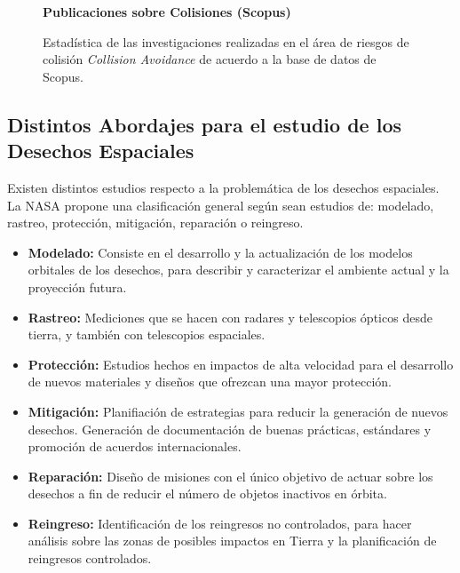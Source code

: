 \begin{figure}[!h]
\centering
   \textbf{Publicaciones sobre Colisiones (Scopus)}\par\medskip
    \caption[Riesgos de Colisi\'on seg\'un Scopus]{Estad\'istica de las investigaciones realizadas en el \'area de riesgos de colisi\'on {\it{Collision Avoidance}} de acuerdo a la base de datos de Scopus.}
    \label{fig:scopusCA}
\end{figure} 

\subsection*{Distintos Abordajes para el estudio de los Desechos Espaciales}
Existen distintos estudios respecto a la problem\'atica de los desechos espaciales. La \ac{NASA} propone una clasificaci\'on general seg\'un sean estudios de: modelado, rastreo, protecci\'on, mitigaci\'on, reparaci\'on o reingreso.\\
\begin{itemize}
\item {\bf{Modelado:}} Consiste en el desarrollo y la actualizaci\'on de los modelos orbitales de los desechos, para describir y caracterizar el ambiente actual y la proyecci\'on futura.\\
\item {\bf{Rastreo:}} Mediciones que se hacen con radares y telescopios \'opticos desde tierra, y tambi\'en con telescopios espaciales.\\
\item {\bf{Protecci\'on:}} Estudios hechos en impactos de alta velocidad para el desarrollo de nuevos materiales y dise\~nos que ofrezcan una mayor protecci\'on.\\
\item {\bf{Mitigaci\'on:}} Planifiaci\'on de estrategias para reducir la generaci\'on de nuevos desechos. Generaci\'on de documentaci\'on  de buenas pr\'acticas, est\'andares y promoci\'on de acuerdos internacionales.\\
\item {\bf{Reparaci\'on:}} Dise\~no de misiones con el \'unico objetivo de actuar sobre los desechos a fin de reducir el n\'umero de objetos inactivos en \'orbita.\\
\item {\bf{Reingreso:}} Identificaci\'on de los reingresos no controlados, para hacer an\'alisis sobre las zonas de posibles impactos en Tierra y la planificaci\'on de reingresos controlados.\\
\end{itemize}

